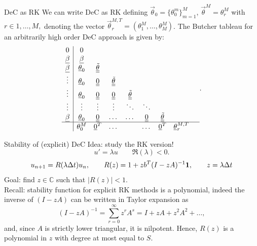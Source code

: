 \documentclass[9pt,compress,t,aspectratio=169]{beamer}
\begin{document}
\begin{frame}{DeC as RK}
	We can write DeC as RK defining $\vec{\theta}_0 = \lbrace\theta_0^m\rbrace_{m=1}^M$, $\vec{\theta}^M=\theta_r^{M}$ with $r \in 1, \dots, M, $  denoting the vector  $ \vec{\theta}_r^{M,T} =(\theta_1^M, \dots, \theta_M^M )$.
		The Butcher tableau for an arbitrarily high order DeC approach is given by:
		\begin{equation}\label{eq:DeC_RK}
			\begin{aligned}
				\begin{array}{c|cccccccc}
					0 & 0 &   & &  & & &  & \\
					\underline{\beta} & \underline{\beta} &  &   & & & & &  \\
					\underline{\beta}  & \underline{\theta}_0 &   \underline{\underline{\tilde{\theta}}} & & & & & &\\
					\vdots & \underline{\theta}_0 & \underline{\underline{0}}  &\underline{\underline{\tilde{\theta}}}   && & & &\\
					\vdots & \underline{\theta}_0 &  \underline{\underline{0}}   &   \underline{\underline{0}}  & \underline{\underline{\tilde{\theta}}}  &  &  & &\\
					\vdots &  \vdots  &  \vdots &  \vdots &  \ddots  &  \ddots& & & \\
					\underline{\beta} & \underline{\theta}_0 &  \underline{\underline{0}}  &  \dots &  \dots & \underline{\underline{0}}  &  \underline{\underline{\tilde{\theta}}} & \\
					\hline
					&  \theta_0^M & \underline{0}^T    & \dots  &   &   \dots &    \underline{0}^T& \underline{\theta}_r^{M,T} 
				\end{array}.
			\end{aligned}
	\end{equation}
\end{frame}

\begin{frame}{Stability of (explicit) DeC}
	Idea: study the RK version!
\begin{equation}
	u'=\lambda u \qquad \Re(\lambda)<0.
\end{equation}
\begin{equation}
	u_{n+1}=R(\lambda \Delta t) u_n,\qquad	R(z) = 1+ z b^T (I-zA)^{-1} \mathbf{1},\qquad z=\lambda \Delta t
\end{equation}
Goal: find $z\in \mathbb C$ such that $\lvert R(z) \rvert< 1$. \\
Recall: stability function for explicit RK methods is a polynomial, indeed the inverse of $(I-zA)$ can be written in Taylor expansion as
\begin{equation}
	(I-zA)^{-1} = \sum_{r=0}^{\infty} z^r A^s = I + zA + z^2A^2+\dots, 
\end{equation} 
and, since $A$ is strictly lower triangular, it is nilpotent.
Hence, $R(z)$ is a polynomial in $z$ with degree at most equal to $S$.

\end{frame}
\end{document}
